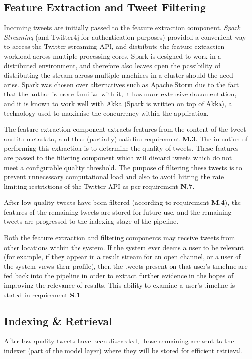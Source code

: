 \documentclass{l4proj}
\begin{document}
    \subsection{Feature Extraction and Tweet Filtering}
        Incoming tweets are initially passed to the feature extraction component. \textit{Spark Streaming} (and Twitter4j for authentication purposes) provided a convenient way to access the Twitter streaming API, and distribute the feature extraction workload across multiple processing cores. Spark is designed to work in a distributed environment, and therefore also leaves open the possibility of distributing the stream across multiple machines in a cluster should the need arise. Spark was chosen over alternatives such as Apache Storm due to the fact that the author is more familiar with it, it has more extensive documentation, and it is known to work well with Akka (Spark is written on top of Akka), a technology used to maximise the concurrency within the application.
        
        The feature extraction component extracts features from the content of the tweet and its metadata, and thus (partially) satisfies requirement \textbf{M.3}. The intention of performing this extraction is to determine the quality of tweets. These features are passed to the filtering component which will discard tweets which do not meet a configurable quality threshold. The purpose of filtering these tweets is to prevent unnecessary computational load and also to avoid hitting the rate limiting restrictions of the Twitter API as per requirement \textbf{N.7}.
        
        After low quality tweets have been filtered (according to requirement \textbf{M.4}), the features of the remaining tweets are stored for future use, and the remaining tweets are progressed to the indexing stage of the pipeline.

Both the feature extraction and filtering components may receive tweets from other locations within the system. If the system ever deems a user to be relevant (for example, if they appear in a result stream for an open channel, or a user of the system views their profile), then the tweets present on that user’s timeline are fed back into the pipeline in order to extract further evidence in the hopes of improving the relevance of results. This ability to examine a user's timeline is stated in requirement \textbf{S.1}.

        \subsection{Indexing \& Retrieval}
        After low quality tweets have been discarded, those remaining are sent to the indexer (part of the model layer) where they will be stored for efficient retrieval. 
        
\end{document}
